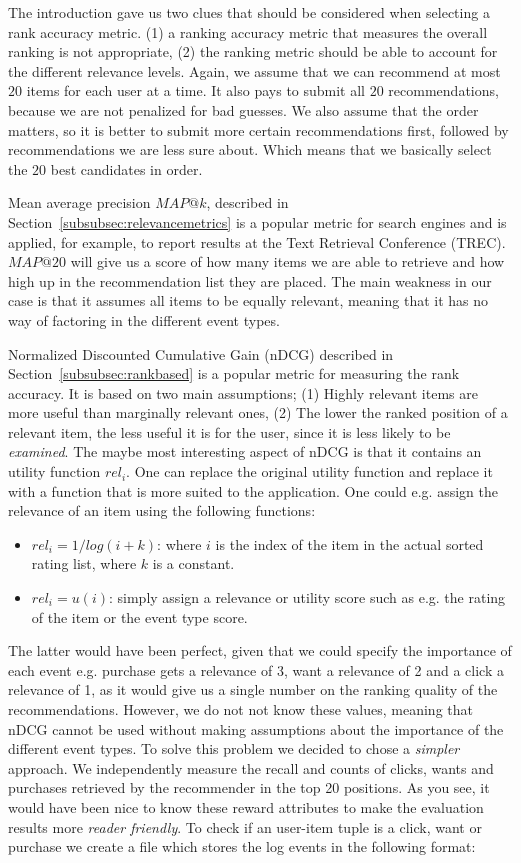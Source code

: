 The introduction gave us two clues that should be considered when selecting a rank accuracy metric.
(1) a ranking accuracy metric that measures the overall ranking is not appropriate, (2) the ranking
metric should be able to account for the different relevance levels.
Again, we assume that we can recommend at most $20$ items for each user at a time. It also pays to submit all $20$
recommendations, because we are not penalized for bad guesses. We also assume that the order matters, so it
is better to submit more certain recommendations first, followed by recommendations we are less sure about.
Which means that we basically select the $20$ best candidates in order.


Mean average precision $MAP@k$, described in Section~\ref{subsubsec:relevancemetrics} is a popular metric for search
engines and is applied, for example, to report results at the Text Retrieval Conference (TREC). $MAP@20$ will give us a score
of how many items we are able to retrieve and how high up in the recommendation list they are placed. The main weakness in our
case is that it assumes all items to be equally relevant, meaning that it has no way of factoring in the different event types.

Normalized Discounted Cumulative Gain (nDCG) described in Section~\ref{subsubsec:rankbased} is a popular metric for
measuring the rank accuracy. It is based on two main assumptions; (1) Highly relevant items are more useful than marginally relevant ones,
(2) The lower the ranked position of a relevant item, the less useful it is for the user, since it is less likely to be \emph{examined}.
The maybe most interesting aspect of nDCG is that it contains an utility function $rel_i$. One can replace the original utility function
and replace it with a function that is more suited to the application. One could e.g. assign the relevance of an item using
the following functions:

\begin{itemize}
\item $rel_i = 1/log(i+k)$: where $i$ is the index of the item in the actual sorted rating list, where $k$ is a constant.
\item $rel_i = u(i)$: simply assign a relevance or utility score such as e.g. the rating of the item or the event type score.
\end{itemize}

The latter would have been perfect, given that we could specify the importance of each event e.g. purchase gets a relevance of 3, want
a relevance of 2 and a click a relevance of 1, as it would give us a single number on the ranking quality of the recommendations.
However, we do not not know these values, meaning that nDCG cannot be used without making assumptions about the importance of the different
event types. To solve this problem we decided to chose a \emph{simpler} approach. We independently measure the recall
and counts of clicks, wants and purchases retrieved by the recommender in the top 20 positions. As you see, it would have been nice to know these
reward attributes to make the evaluation results more \emph{reader friendly}. To check if an user-item tuple is a click, want or purchase we create
a file which stores the log events in the following format:



